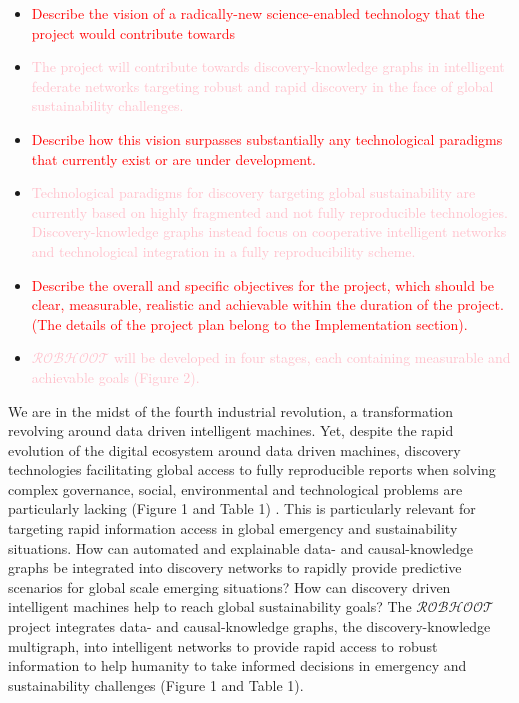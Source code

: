 \documentclass[12pt, a4paper]{article} %
\begin{document}
\begin{itemize}
\item \textcolor{red}{Describe the vision of a radically-new science-enabled
    technology that the project would contribute towards}
\item \textcolor{pink}{The project will contribute towards
    discovery-knowledge graphs in intelligent federate networks
    targeting robust and rapid discovery in the face of global
    sustainability challenges.}
\item \textcolor{red}{Describe how this vision surpasses substantially
    any technological paradigms that currently exist or are under
    development.}
\item \textcolor{pink}{Technological paradigms for discovery targeting
    global sustainability are currently based on highly fragmented and
    not fully reproducible technologies. Discovery-knowledge graphs
    instead focus on cooperative intelligent networks and
    technological integration in a fully reproducibility scheme.}
\item \textcolor{red}{Describe the overall and specific objectives for
    the project, which should be clear, measurable, realistic and
    achievable within the duration of the project. (The details of the
    project plan belong to the Implementation section).}
\item \textcolor{pink}{$\mathcal{ROBHOOT}$ will be developed in four
    stages, each containing measurable and achievable goals (Figure
    2).}
\end{itemize}

We are in the midst of the fourth industrial revolution, a
transformation revolving around data driven intelligent machines. Yet,
despite the rapid evolution of the digital ecosystem around data
driven machines, discovery technologies facilitating global access to
fully reproducible reports when solving complex governance, social,
environmental and technological problems are particularly lacking
(Figure 1 and Table 1) \citep{Mastrangelo2019}. This is particularly
relevant for targeting rapid information access in global emergency
and sustainability situations. How can automated and explainable data-
and causal-knowledge graphs be integrated into discovery networks to
rapidly provide predictive scenarios for global scale emerging
situations? How can discovery driven intelligent machines help to
reach global sustainability goals? The $\mathcal{ROBHOOT}$ project
integrates data- and causal-knowledge graphs, the discovery-knowledge
multigraph, into intelligent networks to provide rapid access to
robust information to help humanity to take informed decisions in
emergency and sustainability challenges (Figure 1 and Table 1).
\end{document}
